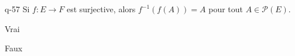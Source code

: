 \begin{truefalse}{q-57}
Si $f:E\to F$ est surjective, alors $f^{-1}(f(A))=A$ pour tout $A\in\mathcal{P}(E)$.
\item Vrai
\item* Faux
\end{truefalse}

